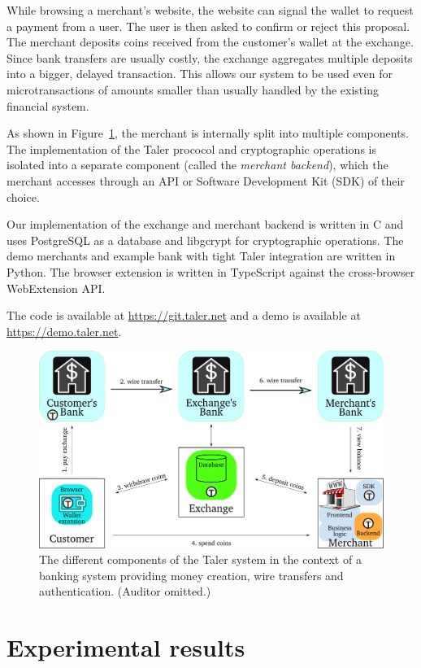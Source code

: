 \documentclass[sigconf, authordraft]{acmart}
\begin{document}
While browsing a merchant's website, the website can signal the wallet to
request a payment from a user.  The user is then asked to confirm or reject
this proposal.  The merchant deposits coins received from the customer's wallet
at the exchange.  Since bank transfers are usually costly, the exchange
aggregates multiple deposits into a bigger, delayed transaction.  This allows
our system to be used even for microtransactions of amounts smaller than
usually handled by the existing financial system.

As shown in Figure~\ref{fig:taler-arch}, the merchant is internally split into
multiple components.  The implementation of the Taler prococol and
cryptographic operations is isolated into a separate component (called the
\emph{merchant backend}), which the merchant accesses through an API or Software
Development Kit (SDK) of their choice.

Our implementation of the exchange and merchant backend is written in C and
uses PostgreSQL as a database and libgcrypt for cryptographic operations.
The demo merchants and example bank with tight Taler integration are written in Python.
The browser extension is written in TypeScript against the cross-browser
WebExtension API.

The code is available at \url{https://git.taler.net} and a demo
is available at \url{https://demo.taler.net}.


\begin{figure}\label{fig:taler-arch}
  \includegraphics[width=\columnwidth]{taler-arch-full.pdf}
  \caption{The different components of the Taler system in the
    context of a banking system providing money creation,
    wire transfers and authentication. (Auditor omitted.)}
\end{figure}


\section{Experimental results}
\end{document}
